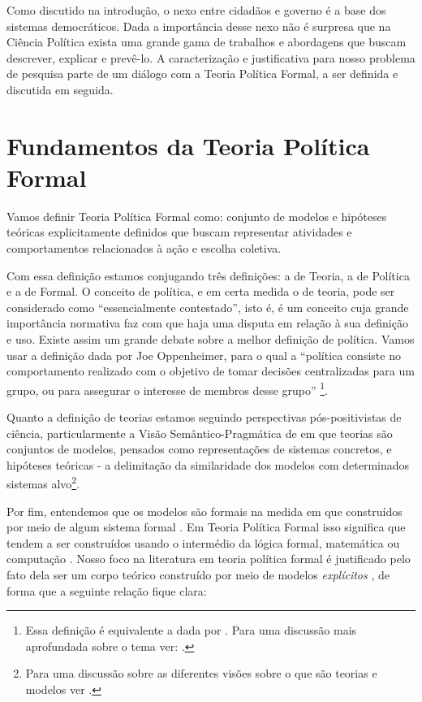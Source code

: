 Como discutido na introdução, o nexo entre cidadãos e governo é a base dos
sistemas democráticos. Dada a importância desse nexo não é surpresa que na
Ciência Política exista uma grande gama de trabalhos e abordagens que buscam
descrever, explicar e prevê-lo. A caracterização e justificativa para nosso
problema de pesquisa parte de um diálogo com a Teoria Política Formal, a ser
definida e discutida em seguida.

\section{Fundamentos da Teoria Política Formal}

Vamos definir Teoria Política Formal como: conjunto de modelos e hipóteses
teóricas explicitamente definidos que buscam representar atividades e
comportamentos relacionados à ação e escolha coletiva.

Com essa definição estamos conjugando três definições: a de Teoria, a de
Política e a de Formal. O conceito de política, e em certa medida o de teoria,
pode ser considerado como ``essencialmente contestado'', isto é, é um conceito
cuja grande importância normativa faz com que haja uma disputa em relação à sua
definição e uso\cite{collier2006essentially}. Existe assim um grande debate
sobre a melhor definição de  política. Vamos usar a definição
dada por Joe Oppenheimer, para o qual  a ``política consiste
no comportamento realizado com o objetivo de tomar decisões centralizadas para
um grupo, ou para assegurar o interesse de membros desse grupo'' \cite[p.
I]{oppenheimer2012principles}\footnote{Essa definição é equivalente a dada por
  . Para uma discussão mais aprofundada sobre o
  tema ver: .}.

Quanto a definição de teorias estamos seguindo perspectivas pós-positivistas de
ciência, particularmente a Visão Semântico-Pragmática de
 em que teorias são conjuntos de modelos, pensados
como representações de sistemas concretos, e hipóteses teóricas - a delimitação
da similaridade dos modelos com determinados sistemas alvo\footnote{Para uma
  discussão sobre as diferentes visões sobre o que são teorias e modelos ver
  .}.

Por fim, entendemos que os modelos são formais na medida em que construídos por
meio de algum sistema formal \cite{wong2015formal}. Em Teoria Política Formal
isso significa que tendem a ser construídos usando o intermédio da lógica formal,
matemática ou computação \cite{morton1999methods}. Nosso foco na literatura em
teoria política formal é justificado pelo fato dela ser um corpo teórico
construído por meio de modelos \textit{explícitos} \cite{epstein2008model}, de
forma que a seguinte relação fique clara:

